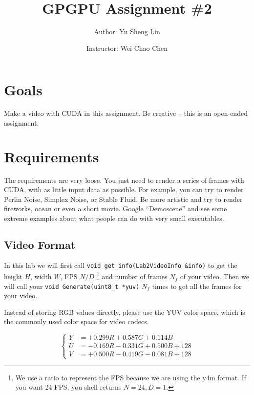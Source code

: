 \documentclass[12pt,a4paper]{article}
\begin{document}
\title{GPGPU Assignment \#2}
\author{Author: Yu Sheng Lin \and Instructor: Wei Chao Chen}
\maketitle

\section{Goals}

Make a video with CUDA in this assignment.  Be creative -- this is an open-ended assignment.

\section{Requirements}

The requirements are very loose.  You just need to render a series of frames with CUDA, with as little input data as possible.
For example, you can try to render Perlin Noise, Simplex Noise, or Stable Fluid.
Be more artistic and try to render fireworks, ocean or even a short movie.
Google ``Demoscene'' and see some extreme examples about what people can do with very small executables.

\subsection{Video Format}

In this lab we will first call \verb+void get_info(Lab2VideoInfo &info)+
to get the height $H$, width $W$, FPS
$N/D$ \footnote{We use a ratio to represent the FPS because we are using the y4m format. If you want 24 FPS, you shell returns $N = 24, D = 1$.}
and number of frames $N_f$ of your video.
Then we will call your \verb+void Generate(uint8_t *yuv)+ $N_f$ times to get all the frames for your video.

Instead of storing RGB values directly,
please use the YUV color space, which is the commonly used color space for video codecs.

\begin{equation}
\left\lbrace
\begin{aligned}
Y &= +0.299R+0.587G+0.114B\\
U &= -0.169R-0.331G+0.500B+128\\
V &= +0.500R-0.419G-0.081B+128
\end{aligned}
\right.
\end{equation}
\end{document}
